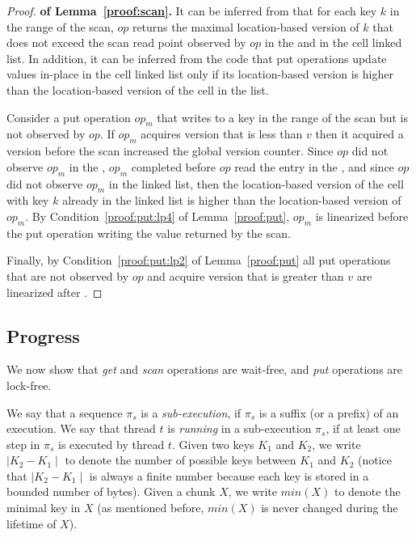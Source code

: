 \begin{proof}\textbf{of Lemma~\ref{proof:scan}.}
It can be inferred from  that for each key $k$ in the range of the scan, $op$ returns the maximal location-based version of $k$ that does not exceed the scan read point observed by $op$ in the  and in the cell linked list. In addition, it can be inferred from the code that put operations update values in-place in the cell linked list only if its location-based version is higher than the location-based version of the cell in the list.

Consider a put operation $op_m$ that writes to a key in the range of the scan but is not observed by $op$. If $op_m$ acquires version that is less than $v$ then it acquired a version before the scan increased the global version counter. Since $op$ did not observe $op_m$ in the , $op_m$ completed before $op$ read the entry in the , and since $op$ did not observe $op_m$ in the linked list, then the location-based version of the cell with key $k$ already in the linked list is higher than the location-based version of $op_m$.
By Condition~\ref{proof:put:lp4} of Lemma~\ref{proof:put}, $op_m$ is linearized before the put operation writing the value returned by the scan.

Finally, by Condition~\ref{proof:put:lp2} of Lemma~\ref{proof:put} all put operations that are not observed by $op$ and acquire version that is greater than $v$ are linearized after .
\end{proof}


\subsection{Progress}
\label{app:proof:progress}

\newcommand{\abs}[1]{\mid{#1}\mid}

We now show that \emph{get} and \emph{scan} operations are wait-free, and \emph{put} operations are lock-free.

We say that a sequence $\pi_s$ is a \emph{sub-execution}, if $\pi_s$ is a suffix (or a prefix) of an execution.
We say that thread $t$ is \emph{running} in a sub-execution $\pi_s$, if at least one step in $\pi_s$ is executed by thread $t$.
%
Given two keys $K_1$ and $K_2$, we write $\abs{K_2 - K_1}$ to denote the number of possible keys between $K_1$ and $K_2$ (notice that $\abs{K_2 - K_1}$ is always a finite number because each key is stored in a bounded number of bytes).
%
Given a chunk $X$, we write $min(X)$ to denote the minimal key in $X$ (as mentioned before, $min(X)$ is never changed during the lifetime of $X$).



